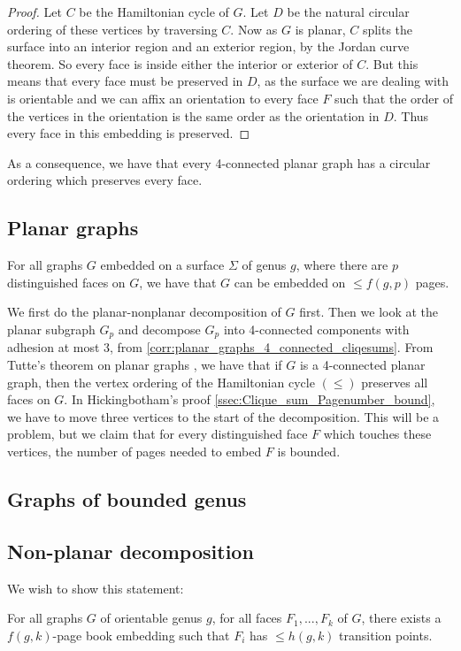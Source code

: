 \begin{proof}
	Let $C$ be the Hamiltonian cycle of $G$. Let $D$ be the natural circular ordering of these vertices by traversing $C$. Now as $G$ is planar, $C$ splits the surface into an interior region and an exterior region, by the Jordan curve theorem. So every face is inside either the interior or exterior of $C$. But this means that every face must be preserved in $D$, as the surface we are dealing with is orientable and we can affix an orientation to every face $F$ such that the order of the vertices in the orientation is the same order as the orientation in $D$. Thus every face in this embedding is preserved. 
	
\end{proof}
As a consequence, we have that every 4-connected planar graph has a circular ordering which preserves every face. 
\subsection{Planar graphs}
\begin{conjecture}\label{conj:4-planar graphs}
	For all graphs $G$ embedded on a surface $\Sigma$ of genus $g$, where there are $p$ distinguished faces on $G$, we have that $G$ can be embedded on $\leq f(g, p)$ pages.
\end{conjecture}
We first do the planar-nonplanar decomposition of $G$ first. 
Then we look at the planar subgraph $G_p$ and decompose $G_p$ into 4-connected components with adhesion at most 3, from \cref{corr:planar_graphs_4_connected_cliqesums}. 
From Tutte's theorem on planar graphs \cite{tutteTheoremPlanarGraphs1956}, we have that if $G$ is a 4-connected planar graph, then the vertex ordering of the Hamiltonian cycle $(\leq)$ preserves all faces on $G$.
In Hickingbotham's proof \cref{ssec:Clique_sum_Pagenumber_bound}, we have to move three vertices to the start of the decomposition. This will be a problem, but we claim that for every distinguished face $F$ which touches these vertices, the number of pages needed to embed $F$ is bounded. 


\subsection{Graphs of bounded genus}

\subsection{Non-planar decomposition}
We wish to show this statement:
\begin{theorem}
	For all graphs $G$ of orientable genus $g$, for all faces $F_1, ..., F_k$ of $G$, there exists a $f(g, k)$-page book embedding such that $F_i$ has $\leq h(g, k)$ transition points. 
\end{theorem}

